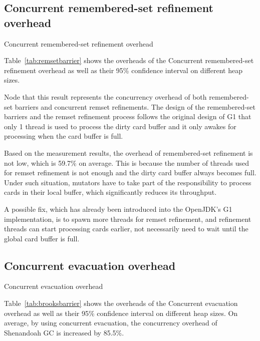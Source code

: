 \subsection{Concurrent remembered-set refinement overhead}

\begin{table*}
  \centering
  
  \caption{Concurrent remembered-set refinement overhead}
  \label{tab:remsetbarrier}
\end{table*}

Table~\ref{tab:remsetbarrier} shows the overheads of the Concurrent remembered-set refinement overhead
as well as their 95\% confidence interval on different heap sizes.

Node that this result represents the concurrency overhead of both remembered-set barriers and concurrent remset refinements.
The design of the remembered-set barriers and the remset refinement process follows
the original design of G1 that only 1 thread is used to process the dirty card
buffer and it only awakes for processing when the card buffer is full.

Based on the measurement results, the overhead of remembered-set refinement is not low,
which is 59.7\% on average. This is because the number of threads used for remset refinement
is not enough and the dirty card buffer always becomes full. Under such situation,
mutators have to take part of the responsibility to process cards in their local buffer,
which significantly reduces its throughput.

A possible fix, which has already been introduced into the OpenJDK's G1 implementation, is
to spawn more threads for remset refinement, and refinement threads can start processing cards earlier,
not necessarily need to wait until the global card buffer is full.

\subsection{Concurrent evacuation overhead}

\begin{table*}
  \centering
  
  \caption{Concurrent evacuation overhead}
  \label{tab:brooksbarrier}
\end{table*}

Table~\ref{tab:brooksbarrier} shows the overheads of the Concurrent evacuation overhead
as well as their 95\% confidence interval on different heap sizes.
On average, by using concurrent evacuation, the concurrency overhead of Shenandoah GC
is increased by 85.5\%.

